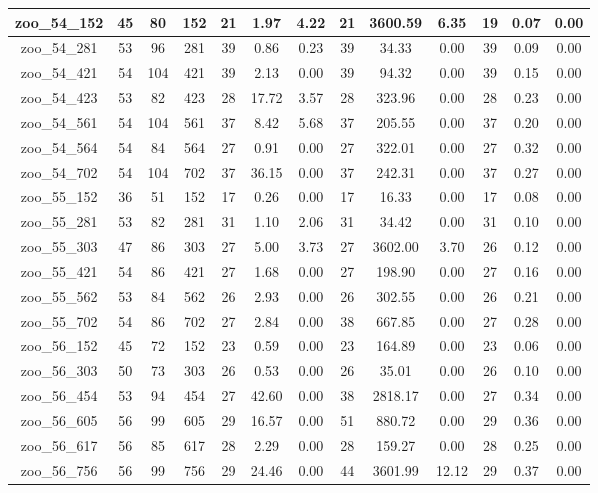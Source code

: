 \begin{landscape}
\begin{longtable}{|c|c|c|c|c|c|c|c|c|c|c|c|c|}
zoo\_54\_152 & 45 & 80 & 152 & 21 & 1.97 & 4.22 & 21 & 3600.59 & 6.35 & 19 & 0.07 & 0.00 \\ \hline 
zoo\_54\_281 & 53 & 96 & 281 & 39 & 0.86 & 0.23 & 39 & 34.33 & 0.00 & 39 & 0.09 & 0.00 \\ \hline 
zoo\_54\_421 & 54 & 104 & 421 & 39 & 2.13 & 0.00 & 39 & 94.32 & 0.00 & 39 & 0.15 & 0.00 \\ \hline 
zoo\_54\_423 & 53 & 82 & 423 & 28 & 17.72 & 3.57 & 28 & 323.96 & 0.00 & 28 & 0.23 & 0.00 \\ \hline 
zoo\_54\_561 & 54 & 104 & 561 & 37 & 8.42 & 5.68 & 37 & 205.55 & 0.00 & 37 & 0.20 & 0.00 \\ \hline 
zoo\_54\_564 & 54 & 84 & 564 & 27 & 0.91 & 0.00 & 27 & 322.01 & 0.00 & 27 & 0.32 & 0.00 \\ \hline 
zoo\_54\_702 & 54 & 104 & 702 & 37 & 36.15 & 0.00 & 37 & 242.31 & 0.00 & 37 & 0.27 & 0.00 \\ \hline 
zoo\_55\_152 & 36 & 51 & 152 & 17 & 0.26 & 0.00 & 17 & 16.33 & 0.00 & 17 & 0.08 & 0.00 \\ \hline 
zoo\_55\_281 & 53 & 82 & 281 & 31 & 1.10 & 2.06 & 31 & 34.42 & 0.00 & 31 & 0.10 & 0.00 \\ \hline 
zoo\_55\_303 & 47 & 86 & 303 & 27 & 5.00 & 3.73 & 27 & 3602.00 & 3.70 & 26 & 0.12 & 0.00 \\ \hline 
zoo\_55\_421 & 54 & 86 & 421 & 27 & 1.68 & 0.00 & 27 & 198.90 & 0.00 & 27 & 0.16 & 0.00 \\ \hline 
zoo\_55\_562 & 53 & 84 & 562 & 26 & 2.93 & 0.00 & 26 & 302.55 & 0.00 & 26 & 0.21 & 0.00 \\ \hline 
zoo\_55\_702 & 54 & 86 & 702 & 27 & 2.84 & 0.00 & 38 & 667.85 & 0.00 & 27 & 0.28 & 0.00 \\ \hline 
zoo\_56\_152 & 45 & 72 & 152 & 23 & 0.59 & 0.00 & 23 & 164.89 & 0.00 & 23 & 0.06 & 0.00 \\ \hline 
zoo\_56\_303 & 50 & 73 & 303 & 26 & 0.53 & 0.00 & 26 & 35.01 & 0.00 & 26 & 0.10 & 0.00 \\ \hline 
zoo\_56\_454 & 53 & 94 & 454 & 27 & 42.60 & 0.00 & 38 & 2818.17 & 0.00 & 27 & 0.34 & 0.00 \\ \hline 
zoo\_56\_605 & 56 & 99 & 605 & 29 & 16.57 & 0.00 & 51 & 880.72 & 0.00 & 29 & 0.36 & 0.00 \\ \hline 
zoo\_56\_617 & 56 & 85 & 617 & 28 & 2.29 & 0.00 & 28 & 159.27 & 0.00 & 28 & 0.25 & 0.00 \\ \hline 
zoo\_56\_756 & 56 & 99 & 756 & 29 & 24.46 & 0.00 & 44 & 3601.99 & 12.12 & 29 & 0.37 & 0.00 \\ \hline 

\end{longtable}
\end{landscape}
